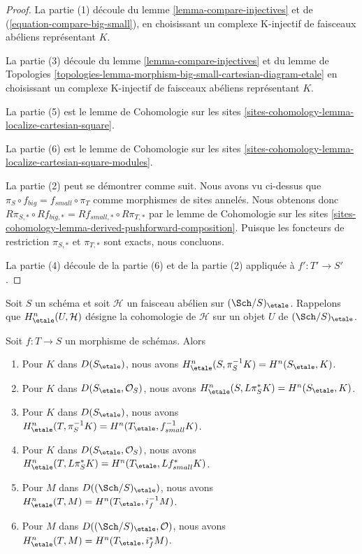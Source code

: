 \begin{proof}
La partie (1) découle du
lemme \ref{lemma-compare-injectives}
et de (\ref{equation-compare-big-small}),
en choisissant un complexe K-injectif de faisceaux abéliens représentant $K$.

\medskip\noindent
La partie (3) découle du lemme \ref{lemma-compare-injectives}
et du lemme de Topologies
\ref{topologies-lemma-morphism-big-small-cartesian-diagram-etale}
en choisissant un complexe K-injectif de faisceaux abéliens représentant $K$.

\medskip\noindent
La partie (5) est le lemme de Cohomologie sur les sites
\ref{sites-cohomology-lemma-localize-cartesian-square}.

\medskip\noindent
La partie (6) est le lemme de Cohomologie sur les sites
\ref{sites-cohomology-lemma-localize-cartesian-square-modules}.

\medskip\noindent
La partie (2) peut se démontrer comme suit. Nous avons vu ci-dessus
que $\pi_S \circ f_{big} = f_{small} \circ \pi_T$ comme morphismes
de sites annelés. Nous obtenons donc
$R\pi_{S, *} \circ Rf_{big, *} = Rf_{small, *} \circ R\pi_{T, *}$
par le lemme de Cohomologie sur les sites
\ref{sites-cohomology-lemma-derived-pushforward-composition}.
Puisque les foncteurs de restriction $\pi_{S, *}$ et $\pi_{T, *}$
sont exacts, nous concluons.

\medskip\noindent
La partie (4) découle de la partie (6) et de la partie (2) appliquée à $f' : T' \to S'$.
\end{proof}

\noindent
Soit $S$ un schéma et soit $\mathcal{H}$ un faisceau abélien sur
$(\Sch/S)_\etale$. Rappelons que $H^n_\etale(U, \mathcal{H})$ désigne
la cohomologie de $\mathcal{H}$ sur un objet $U$ de $(\Sch/S)_\etale$.

\begin{lemma}
\label{lemma-compare-cohomology}
Soit $f : T \to S$ un morphisme de schémas. Alors
\begin{enumerate}
\item Pour $K$ dans $D(S_\etale)$, nous avons
$H^n_\etale(S, \pi_S^{-1}K) = H^n(S_\etale, K)$.
\item Pour $K$ dans $D(S_\etale, \mathcal{O}_S)$, nous avons
$H^n_\etale(S, L\pi_S^*K) = H^n(S_\etale, K)$.
\item Pour $K$ dans $D(S_\etale)$, nous avons
$H^n_\etale(T, \pi_S^{-1}K) = H^n(T_\etale, f_{small}^{-1}K)$.
\item Pour $K$ dans $D(S_\etale, \mathcal{O}_S)$, nous avons
$H^n_\etale(T, L\pi_S^*K) = H^n(T_\etale, Lf_{small}^*K)$.
\item Pour $M$ dans $D((\Sch/S)_\etale)$, nous avons
$H^n_\etale(T, M) = H^n(T_\etale, i_f^{-1}M)$.
\item Pour $M$ dans $D((\Sch/S)_\etale, \mathcal{O})$, nous avons
$H^n_\etale(T, M) = H^n(T_\etale, i_f^*M)$.
\end{enumerate}
\end{lemma}

